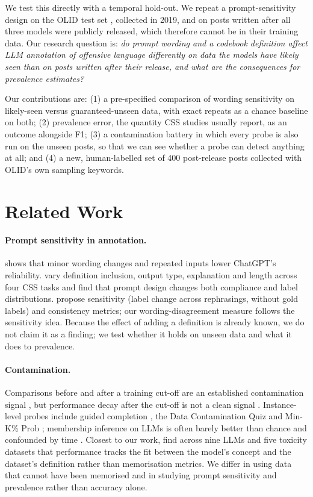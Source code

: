 \documentclass[11pt]{article}
\begin{document}
We test this directly with a temporal hold-out. We repeat a prompt-sensitivity design on the OLID test set \citep{zampieri-etal-2019-predicting,barbieri-etal-2020-tweeteval}, collected in 2019, and on posts written after all three models were publicly released, which therefore cannot be in their training data. Our research question is: \emph{do prompt wording and a codebook definition affect LLM annotation of offensive language differently on data the models have likely seen than on posts written after their release, and what are the consequences for prevalence estimates?}

Our contributions are: (1) a pre-specified comparison of wording sensitivity on likely-seen versus guaranteed-unseen data, with exact repeats as a chance baseline on both; (2) prevalence error, the quantity CSS studies usually report, as an outcome alongside F1; (3) a contamination battery in which every probe is also run on the unseen posts, so that we can see whether a probe can detect anything at all; and (4) a new, human-labelled set of 400 post-release posts collected with OLID's own sampling keywords.

\section{Related Work}

\paragraph{Prompt sensitivity in annotation.} \citet{reiss2023testing} shows that minor wording changes and repeated inputs lower ChatGPT's reliability. \citet{atreja2025prompt} vary definition inclusion, output type, explanation and length across four CSS tasks and find that prompt design changes both compliance and label distributions. \citet{errica-etal-2025-wrong} propose sensitivity (label change across rephrasings, without gold labels) and consistency metrics; our wording-disagreement measure follows the sensitivity idea. Because the effect of adding a definition is already known, we do not claim it as a finding; we test whether it holds on unseen data and what it does to prevalence.

\paragraph{Contamination.} Comparisons before and after a training cut-off are an established contamination signal \citep{li2024task}, but performance decay after the cut-off is not a clean signal \citep{zhang-etal-2026-test}. Instance-level probes include guided completion \citep{golchin2024time}, the Data Contamination Quiz \citep{golchin2025dcq} and Min-K\% Prob \citep{shi2024detecting}; membership inference on LLMs is often barely better than chance and confounded by time \citep{duan2024membership}. Closest to our work, \citet{casanova2026limits} find across nine LLMs and five toxicity datasets that performance tracks the fit between the model's concept and the dataset's definition rather than memorisation metrics. We differ in using data that cannot have been memorised and in studying prompt sensitivity and prevalence rather than accuracy alone.
\end{document}

